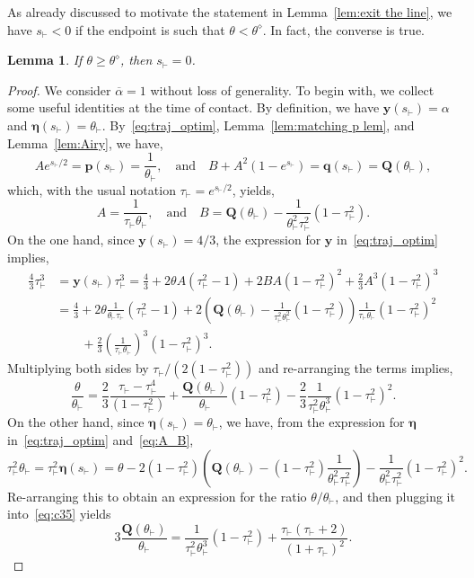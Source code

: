 \documentclass[10pt]{amsart}
\newtheorem{lemm}[theo]{Lemma}\newtheorem{prop}[theo]{Proposition}\newtheorem{coro}[theo]{Corollary}\newtheorem{conj}[theo]{Conjecture}
\theoremstyle{definition}\newtheorem{defi}[theo]{Definition}\newtheorem{rema}[theo]{Remark}\newtheorem{exam}[theo]{Example}\newtheorem{exem}[theo]{Example}\newtheorem{nota}[theo]{Notation}
\newcommand{\bp}{\mathbf{p}}
\newcommand{\bq}{\mathbf{q}}
\newcommand{\bQ}{\mathbf{Q}}
\newcommand{\by}{\mathbf{y}}
\newcommand{\beeta}{\boldsymbol{\eta}}
\newcommand{\1}{\mathds{1}}
\newcommand{\sh}{s_{\vdash}}
\newcommand{\tauh}{\tau_{\vdash}}
\newcommand{\Thetastar}{\theta^{\diamond}}
\newcommand{\shh}{s_{\vdash}}
\newcommand{\tauhh}{\tau_{\vdash}}
\newcommand{\htheta}{\theta_{\vdash}}
\begin{document}
As already discussed to motivate the statement in Lemma~\ref{lem:exit the line}, we have $\shh<0$ if the endpoint is such that $\theta < \Thetastar$. In fact, the converse is true.

\begin{lemm}\label{lem:never leave}
If $\theta \geq \Thetastar$, then $\shh = 0$.
\end{lemm}


\begin{proof}
We consider $\overline{\alpha} = 1$ without loss of generality. To begin with, we collect some useful identities at the time of contact. By definition, we have $\by(\shh) = \alpha$ and $\beeta(\shh) = \htheta$. By~\eqref{eq:traj_optim}, Lemma~\ref{lem:matching p lem}, and Lemma~\ref{lem:Airy}, we have,
\[
A e^{\shh/2} = \bp(\shh) = \frac{1}{\htheta}, \quad \text{and}\quad B + A^2 \left(1 - e^{\shh}\right) =\bq(\shh) = \bQ(\htheta),
\]
which, with the usual notation $\tauhh = e^{\shh/2}$, yields,
\begin{equation}\label{eq:A_B}
A = \frac{1}{\tauhh\htheta}, \quad \text{and}\quad B= \bQ(\htheta) - \frac{1}{\htheta^2 \tauh^2}\left(1-\tauh^2\right).
\end{equation}
On the one hand, since $\by(\shh) = 4/3$, the expression for $\by$ in~\eqref{eq:traj_optim} implies,
\begin{equation*}
\begin{split}
\frac43 \tauh^3 &= \by(\sh) \tauh^{3} = \frac43 + 2\theta A\left(\tauh^2-1\right) + 2BA\left(1-\tauh^2\right)^2 + \frac{2}{3} A^3\left(1 - \tauh^2\right)^3\\
&=\frac43 + 2\theta \frac{1}{\htheta \tauh}\left(\tauh^2-1\right) + 2\left(\bQ(\htheta) - \frac{1}{\tauh^2 \htheta^2}\left(1 - \tauh^2\right)\right)\frac{1}{\tauh \htheta}\left(1-\tauh^2\right)^2
\\
& \qquad+ \frac{2}{3} \left(\frac{1}{\tauh \htheta}\right)^3\left(1 - \tauh^2\right)^3.
\end{split}
\end{equation*}
Multiplying both sides by $\tauh/(2(1-\tauh^2))$ and re-arranging the terms implies,
\begin{equation}\label{eq:c35}
\frac{\theta}{\htheta} = \frac{2}{3}\frac{\tauh - \tauh^4}{\left(1-\tauh^2\right)} + \frac{\bQ(\htheta)}{ \htheta}\left(1-\tauh^2\right) - \frac{2}{3} \frac{1}{\tauh^2 \htheta^3}\left(1 - \tauh^2\right)^2.
\end{equation}
On the other hand, since $\beeta(\sh) = \htheta$, we have, from the expression for $\beeta$ in~\eqref{eq:traj_optim} and~\eqref{eq:A_B},
\begin{equation*}
\tauh^2 \htheta = \tauh^2 \beeta(\sh) = \theta - 2\left(1-\tauh^2\right)\left(\bQ(\htheta) - \left(1 - \tauh^2\right)\frac{1}{\htheta^2 \tauh^2}\right) - \frac{1}{\htheta^2\tauh^2}\left(1-\tauh^2\right)^2.
\end{equation*}
Re-arranging this to obtain an expression for the ratio $\theta/\htheta$, and then plugging it into~\eqref{eq:c35} yields
\begin{equation}\label{eq:preliminary_W}
3\frac{\bQ(\htheta)}{\htheta} = \frac{1}{\tauh^2\htheta^3}\left(1-\tauh^2\right) + \frac{\tauh(\tauh+2)}{(1+\tauh)^2}.
\end{equation}


\end{proof}
\end{document}

